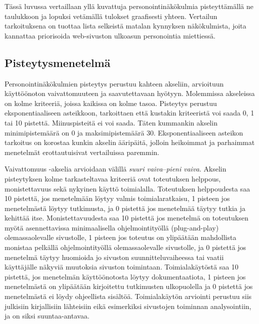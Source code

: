 \documentclass[finnish, 12pt, a4paper, elec, utf8, a-1b, online]{aaltothesis}
\begin{document}
Tässä luvussa vertaillaan yllä kuvattuja personointinäkökulmia pisteyttämällä ne
taulukkoon ja lopuksi vetämällä tulokset graafisesti yhteen. Vertailun
tarkoituksena on tuottaa lista selkeistä matalan kynnyksen näkökulmista,
joita kannattaa priorisoida web-sivuston ulkoasun personointia miettiessä.

\subsection{Pisteytysmenetelmä}

Personointinäkökulmien pisteytys perustuu kahteen akseliin, arvioituun
käyttöönoton vaivattomuuteen ja saavutettavaan hyötyyn. Molemmissa akseleissa on
kolme kriteeriä, joissa kaikissa on kolme tasoa. Pisteytys perustuu
eksponentiaaliseen asteikkoon, tarkoittaen että kustakin kriteeristä voi saada
0, 1 tai 10 pistettä. Miinuspisteitä ei voi saada. Täten kummankin akselin
minimipistemäärä on 0 ja maksimipistemäärä 30. Eksponentiaaliseen asteikon
tarkoitus on korostaa kunkin akselin ääripäitä, jolloin heikoimmat ja parhaimmat
menetelmät erottautuisivat vertailuissa paremmin.

Vaivattomuus -akselia arvioidaan välillä \textit{suuri vaiva}--\textit{pieni
    vaiva}. Akselin pisteytyksen kolme tarkasteltavaa kriteeriä ovat toteutuksen
helppous, monistettavuus sekä nykyinen käyttö toimialalla. Toteutuksen
helppoudesta saa 10 pistettä, jos menetelmään löytyy valmis toimialaratkaisu, 1
pisteen jos menetelmästä löytyy tutkimusta, ja 0 pistettä jos menetelmää täytyy
tutkia ja kehittää itse. Monistettavuudesta saa 10 pistettä jos menetelmä on
toteutuksen myötä asennettavissa minimaalisella ohjelmointityöllä
(plug-and-play) olemassaolevalle sivustolle, 1 pisteen jos toteutus on
ylipäätään mahdollista monistaa pelkällä ohjelmointityöllä olemassaolevalle
sivustolle, ja 0 pistettä jos menetelmä täytyy huomioida jo sivuston
suunnitteluvaiheessa tai vaatii käyttäjälle näkyviä muutoksia sivuston
toimintaan. Toimialakäytöstä saa 10 pistettä, jos menetelmän käyttöönotosta
löytyy dokumentaatiota, 1 pisteen jos menetelmästä on ylipäätään kirjoitettu
tutkimusten ulkopuolella ja 0 pistettä jos menetelmästä ei löydy ohjeellista
sisältöä. Toimialakäytön arviointi perustuu siis julkisiin kirjallisiin
lähteisiin eikä esimerkiksi sivustojen toiminnan analysointiin, ja on siksi
suuntaa-antavaa.
\end{document}

